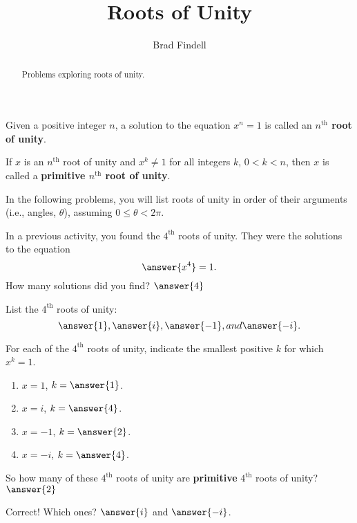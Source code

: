 \documentclass[space,nooutcomes]{ximera}
\title{Roots of Unity}
\author{Brad Findell}
\begin{document}
\begin{abstract}
Problems exploring roots of unity.   
\end{abstract}
\maketitle


\begin{definition}
Given a positive integer $n$, a solution to the equation $x^n=1$ is called an \textbf{$n^\text{th}$  root of unity}.    

If $x$ is an $n^\text{th}$ root of unity and $x^k\ne 1$ for all integers $k$, $0<k<n$, then $x$ is called a \textbf{primitive $n^\text{th}$ root of unity}.
\end{definition}

In the following problems, you will list roots of unity in order of their arguments (i.e., angles, $\theta$), assuming $0\le \theta<2\pi$.  
 
\begin{problem}
In a previous activity, you found the $4^\text{th}$ roots of unity.  They were the solutions to the equation
\[
\answer{x^4} = 1.  
\]
How many solutions did you find?  $\answer{4}$
\begin{problem}
List the $4^\text{th}$ roots of unity: 
\[
\answer{1}, \answer{i}, \answer{-1}, and \answer{-i}. 
\]
\begin{problem}
For each of the $4^\text{th}$ roots of unity, indicate the smallest positive $k$ for which $x^k = 1$.  
\begin{enumerate}
\item $x=1$, $k=\answer{1}$.  
\item $x=i$, $k=\answer{4}$.
\item $x=-1$, $k=\answer{2}$.  
\item $x=-i$, $k=\answer{4}$.
\end{enumerate}
So how many of these $4^\text{th}$ roots of unity are \textbf{primitive} $4^\text{th}$ roots of unity?  
$\answer{2}$
\begin{problem}
Correct!  Which ones?  $\answer{i}$ and $\answer{-i}$.  
\end{problem}
\end{problem}
\end{problem}
\end{problem}
\end{document}
